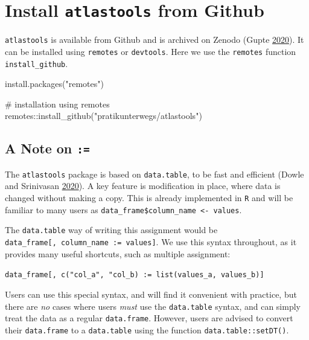 \documentclass[]{scrreprt}
\newenvironment{Shaded}{}{}
\newcommand{\CommentTok}[1]{\textcolor[rgb]{0.00,0.50,0.00}{#1}}
\newcommand{\KeywordTok}[1]{\textcolor[rgb]{0.00,0.00,1.00}{#1}}
\newcommand{\NormalTok}[1]{#1}
\newcommand{\OperatorTok}[1]{#1}
\newcommand{\StringTok}[1]{\textcolor[rgb]{0.00,0.50,0.50}{#1}}
\begin{document}
\hypertarget{install-atlastools-from-github}{%
\section{\texorpdfstring{Install \texttt{atlastools} from Github}{Install atlastools from Github}}\label{install-atlastools-from-github}}

\texttt{atlastools} is available from Github and is archived on Zenodo (Gupte \protect\hyperlink{ref-gupte2020a}{2020}).
It can be installed using \texttt{remotes} or \texttt{devtools}. Here we use the \texttt{remotes} function \texttt{install\_github}.

\begin{Shaded}
\begin{Highlighting}[]
\KeywordTok{install.packages}\NormalTok{(}\StringTok{"remotes"}\NormalTok{)}

\CommentTok{# installation using remotes}
\NormalTok{remotes}\OperatorTok{::}\KeywordTok{install_github}\NormalTok{(}\StringTok{"pratikunterwegs/atlastools"}\NormalTok{)}
\end{Highlighting}
\end{Shaded}

\hypertarget{a-note-on}{%
\subsection*{\texorpdfstring{A Note on \texttt{:=}}{A Note on :=}}\label{a-note-on}}

The \texttt{atlastools} package is based on \texttt{data.table}, to be fast and efficient (Dowle and Srinivasan \protect\hyperlink{ref-dowle2020}{2020}).
A key feature is modification in place, where data is changed without making a copy.
This is already implemented in \texttt{R} and will be familiar to many users as \texttt{data\_frame\$column\_name\ \textless{}-\ values}.

The \texttt{data.table} way of writing this assignment would be \texttt{data\_frame{[},\ column\_name\ :=\ values{]}}.
We use this syntax throughout, as it provides many useful shortcuts, such as multiple assignment:

\texttt{data\_frame{[},\ c("col\_a",\ "col\_b)\ :=\ list(values\_a,\ values\_b){]}}

Users can use this special syntax, and will find it convenient with practice, but there are \emph{no} cases where users \emph{must} use the \texttt{data.table} syntax, and can simply treat the data as a regular \texttt{data.frame}. However, users are advised to convert their \texttt{data.frame} to a \texttt{data.table} using the function \texttt{data.table::setDT()}.
\end{document}
